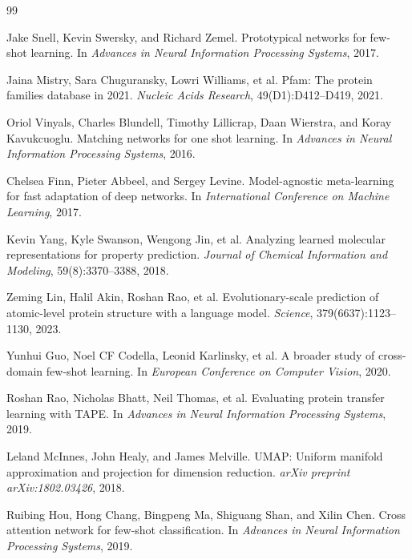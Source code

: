 \documentclass[11pt,a4paper]{article}
\begin{document}

\begin{thebibliography}{99}

Jake Snell, Kevin Swersky, and Richard Zemel.
\newblock Prototypical networks for few-shot learning.
\newblock In \emph{Advances in Neural Information Processing Systems}, 2017.

Jaina Mistry, Sara Chuguransky, Lowri Williams, et al.
\newblock Pfam: The protein families database in 2021.
\newblock \emph{Nucleic Acids Research}, 49(D1):D412--D419, 2021.

Oriol Vinyals, Charles Blundell, Timothy Lillicrap, Daan Wierstra, and
  Koray Kavukcuoglu.
\newblock Matching networks for one shot learning.
\newblock In \emph{Advances in Neural Information Processing Systems}, 2016.

Chelsea Finn, Pieter Abbeel, and Sergey Levine.
\newblock Model-agnostic meta-learning for fast adaptation of deep networks.
\newblock In \emph{International Conference on Machine Learning}, 2017.

Kevin Yang, Kyle Swanson, Wengong Jin, et al.
\newblock Analyzing learned molecular representations for property prediction.
\newblock \emph{Journal of Chemical Information and Modeling}, 59(8):3370--3388,
  2018.

Zeming Lin, Halil Akin, Roshan Rao, et al.
\newblock Evolutionary-scale prediction of atomic-level protein structure with a
  language model.
\newblock \emph{Science}, 379(6637):1123--1130, 2023.

Yunhui Guo, Noel CF Codella, Leonid Karlinsky, et al.
\newblock A broader study of cross-domain few-shot learning.
\newblock In \emph{European Conference on Computer Vision}, 2020.

Roshan Rao, Nicholas Bhatt, Neil Thomas, et al.
\newblock Evaluating protein transfer learning with TAPE.
\newblock In \emph{Advances in Neural Information Processing Systems}, 2019.

Leland McInnes, John Healy, and James Melville.
\newblock UMAP: Uniform manifold approximation and projection for dimension
  reduction.
\newblock \emph{arXiv preprint arXiv:1802.03426}, 2018.

Ruibing Hou, Hong Chang, Bingpeng Ma, Shiguang Shan, and Xilin Chen.
\newblock Cross attention network for few-shot classification.
\newblock In \emph{Advances in Neural Information Processing Systems}, 2019.


\end{thebibliography}
\end{document}

